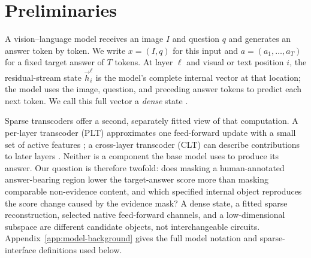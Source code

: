 \section{Preliminaries}
\label{sec:preliminaries}

A vision--language model receives an image $I$ and question $q$ and generates an answer token by token. We write $x=(I,q)$ for this input and $a=(a_1,\ldots,a_T)$ for a fixed target answer of $T$ tokens. At layer $\ell$ and visual or text position $i$, the residual-stream state $\vec{h}_i^\ell$ is the model's complete internal vector at that location; the model uses the image, question, and preceding answer tokens to predict each next token. We call this full vector a \emph{dense} state \citep{elhage2021transformerCircuits}.

Sparse transcoders offer a second, separately fitted view of that computation. A per-layer transcoder (PLT) approximates one feed-forward update with a small set of active features \citep{dunefsky2024transcoders}; a cross-layer transcoder (CLT) can describe contributions to later layers \citep{ameisen2025circuittracing}. Neither is a component the base model uses to produce its answer. Our question is therefore twofold: does masking a human-annotated answer-bearing region lower the target-answer score more than masking comparable non-evidence content, and which specified internal object reproduces the score change caused by the evidence mask? A dense state, a fitted sparse reconstruction, selected native feed-forward channels, and a low-dimensional subspace are different candidate objects, not interchangeable circuits. Appendix~\ref{app:model-background} gives the full model notation and sparse-interface definitions used below.
